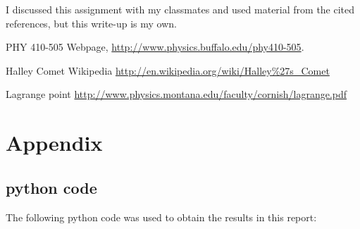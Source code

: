 \documentclass[11pt,letterpaper]{article}
\begin{document}
I discussed this assignment with my classmates and used material from the
cited references, but this write-up is my own.

\begin{thebibliography}{9}


PHY 410-505 Webpage, \url{http://www.physics.buffalo.edu/phy410-505}.



Halley Comet Wikipedia 
\url{http://en.wikipedia.org/wiki/Halley%27s_Comet}

Lagrange point
\url{http://www.physics.montana.edu/faculty/cornish/lagrange.pdf}

\end{thebibliography}

\newpage
\appendix
\section{Appendix}

\subsection{python code}

The following python code was used to obtain the results in this report:








\end{document}
